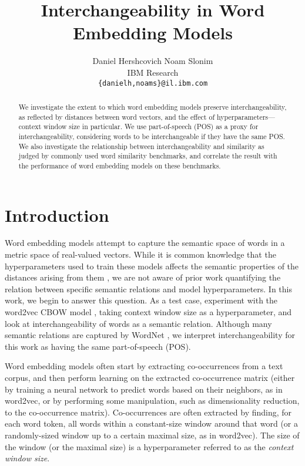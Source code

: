 \documentclass[11pt,a4paper]{article}
\title{Interchangeability in Word Embedding Models}
\author{
Daniel Hershcovich \qquad Noam Slonim \\
IBM Research\\
\texttt{\{danielh,noams\}@il.ibm.com}
}
\begin{document}
    \maketitle

    \begin{abstract}
    We investigate the extent to which word embedding models
    preserve interchangeability, as reflected by distances between
    word vectors, and the effect of hyperparameters---context window size in particular.
    We use part-of-speech (POS) as a proxy for interchangeability,
    considering words to be interchangeable if they have the same POS.
    We also investigate the relationship between interchangeability
    and similarity as judged by commonly	 used word similarity benchmarks,
    and correlate the result with the performance of word embedding models
    on these benchmarks.
    \end{abstract}

    \section{Introduction}\label{sec:introduction}

    Word embedding models attempt to capture the semantic space of words
    in a metric space of real-valued vectors.
    While it is common knowledge that the hyperparameters used to train these
    models affects the semantic properties of the distances arising from them
    \cite{goldberg2016primer}, we are not aware of prior work quantifying the
    relation between specific semantic relations and model hyperparameters.
    In this work, we begin to answer this question.
    As a test case, experiment with the word2vec CBOW model
    \cite{mikolov2013efficient}, taking context window size as a hyperparameter,
    and look at interchangeability of words as a semantic relation.
    Although many semantic relations are captured by WordNet
    \cite{yang2006verb,agirre2009study},
    we interpret interchangeability for this work as having the same part-of-speech
    (POS).
    
    Word embedding models often start by extracting co-occurrences from a text
    corpus, and then perform learning on the extracted co-occurrence matrix
    (either by training a neural network to predict words based on their neighbors,
    as in word2vec, or by performing some manipulation,
    such as dimensionality reduction, to the co-occurrence matrix).
    Co-occurrences are often extracted by finding, for each word token, all
    words within a constant-size window around that word (or a randomly-sized
    window up to a certain maximal size, as in word2vec).
    The size of the window (or the maximal size)
    is a hyperparameter referred to as the \textit{context window size}.
\end{document}
